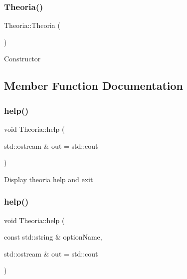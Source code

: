 \subsubsection{\texorpdfstring{Theoria()}{Theoria()}}
{\footnotesize\ttfamily Theoria\+::\+Theoria (\begin{DoxyParamCaption}{ }\end{DoxyParamCaption})}

Constructor 

\subsection{Member Function Documentation}
\mbox{\label{classtheoria_1_1core_1_1Theoria_aff22e3f956bf86e02fdc53ed491f937d}} 
\subsubsection{\texorpdfstring{help()}{help()}\hspace{0.1cm}{\footnotesize\ttfamily [1/3]}}
{\footnotesize\ttfamily void Theoria\+::help (\begin{DoxyParamCaption}\item[{std\+::ostream \&}]{out = {\ttfamily std\+:\+:cout} }\end{DoxyParamCaption})}

Display theoria help and exit \mbox{\label{classtheoria_1_1core_1_1Theoria_aad692a4d64908cba9a10ba8453535f83}} 
\subsubsection{\texorpdfstring{help()}{help()}\hspace{0.1cm}{\footnotesize\ttfamily [2/3]}}
{\footnotesize\ttfamily void Theoria\+::help (\begin{DoxyParamCaption}\item[{const std\+::string \&}]{option\+Name,  }\item[{std\+::ostream \&}]{out = {\ttfamily std\+:\+:cout} }\end{DoxyParamCaption})}


